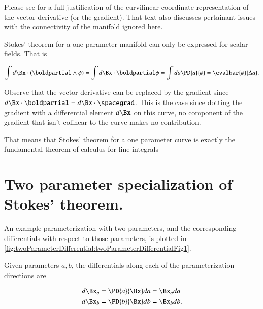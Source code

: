 Please see \citep{aMacdonaldVAGC} for a full justification of the curvilinear coordinate representation of the vector derivative (or the gradient).  That text also discusses pertainant issues with the connectivity of the manifold ignored here.

Stokes' theorem for a one parameter manifold can only be expressed for scalar fields.  That is

\begin{dmath}\label{eqn:stokesTheoremCore:60}
\int d\Bx \cdot (\boldpartial \wedge \phi)
=
\int d\Bx \cdot \boldpartial \phi
=
\int da \PD{a}{ \phi }
= \evalbar{\phi}{\Delta a}.
\end{dmath}

Observe that the vector derivative can be replaced by the gradient since \( d\Bx \cdot \boldpartial = d\Bx \cdot \spacegrad \).
This is the case since dotting the
gradient with a differential element \( d\Bx \) on this curve, no component of the gradient that isn't colinear to the curve makes no contribution.

That means that Stokes' theorem for a one parameter curve is exactly the fundamental theorem of calculus for line integrals


\section{Two parameter specialization of Stokes' theorem.}

An example parameterization with two parameters, and the corresponding differentials with respect to those parameters, is plotted in
\cref{fig:twoParameterDifferential:twoParameterDifferentialFig1}.


Given parameters \( a, b \), the differentials along each of the parameterization directions are

\begin{dmath}\label{eqn:stokesTheoremCore:100}
\begin{aligned}
d\Bx_a &= \PD{a}{\Bx} da = \Bx_a da \\
d\Bx_b &= \PD{b}{\Bx} db = \Bx_b db.
\end{aligned}
\end{dmath}

